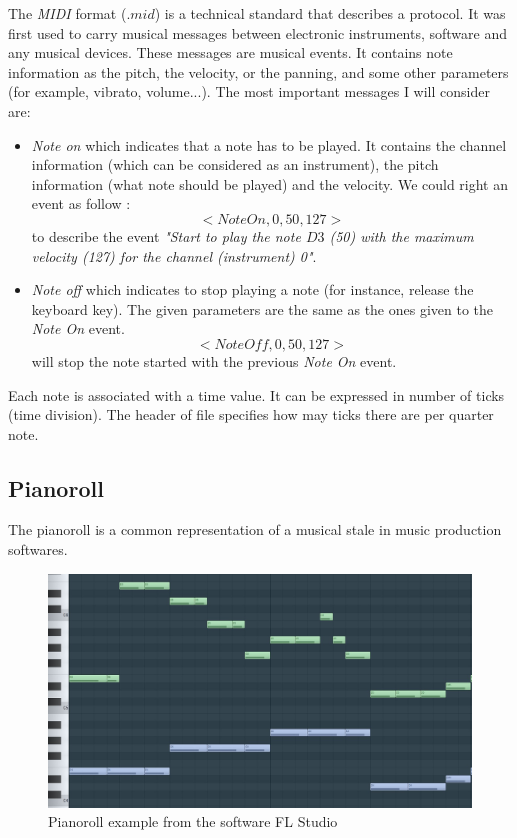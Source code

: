 \documentclass[12pt]{report}
\begin{document}

The \textit{MIDI} format ($.mid$) is a technical standard that describes a protocol.
It was first used to carry musical messages between electronic instruments, software and any musical devices.
These messages are musical events. It contains note information as the pitch, the velocity, or the panning, and some other parameters (for example, vibrato, volume...). 
The most important messages I will consider are:
\begin{itemize}
    \item \textit{Note on} which indicates that a note has to be played. It contains the channel information (which can be considered as an instrument), the pitch information (what note should be played) and the velocity. We could right an event as follow :
    \begin{equation}
        <NoteOn, 0, 50, 127>
    \end{equation}
    to describe the event \textit{"Start to play the note $D3$ (50) with the maximum velocity (127) for the channel (instrument) 0"}.
    \item \textit{Note off} which indicates to stop playing a note (for instance, release the keyboard key). The given parameters are the same as the ones given to the \textit{Note On} event.
    \begin{equation}
        <NoteOff, 0, 50, 127>
    \end{equation}
    will stop the note started with the previous \textit{Note On} event.
\end{itemize}

Each note is associated with a time value.
It can be expressed in number of ticks (time division). The header of file specifies how may ticks there are per quarter note.

\subsection{Pianoroll}

The pianoroll is a common representation of a musical stale in music production softwares.

\begin{figure}[H]
    \centering
    \includegraphics[width=0.75 \textwidth]{images/music/pianoroll/pianoroll_flstudio.jpg}
    \caption{Pianoroll example from the software FL Studio \cite{noauthor_fl_nodate}}
    \label{fig:pianoroll_flstudio}
\end{figure}
\end{document}
